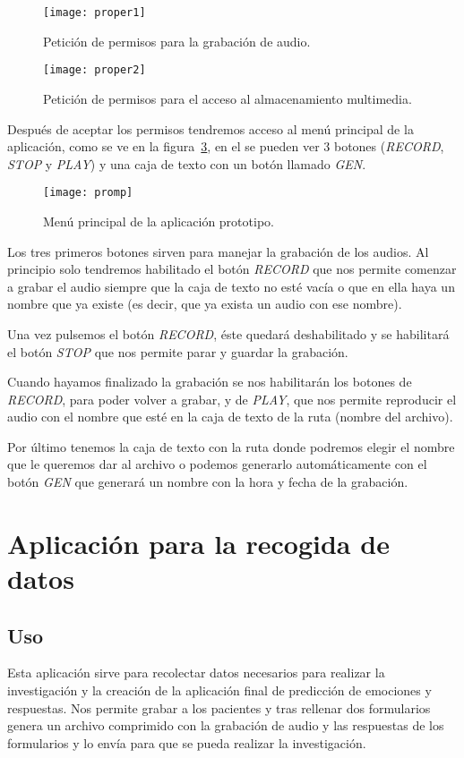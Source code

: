 \begin{figure}[htp]
	\centering
	\texttt{[image: proper1]}
	\caption{Petición de permisos para la grabación de audio.}
	\label{fig:properr1}
\end{figure}

\begin{figure}[htp]
	\centering
	\texttt{[image: proper2]}
	\caption{Petición de permisos para el acceso al almacenamiento multimedia.}
	\label{fig:proper2}
\end{figure}

Después de aceptar los permisos tendremos acceso al menú principal de la aplicación, como se ve en la figura~\ref{fig:promp}, en el se pueden ver 3 botones (\textit{RECORD}, \textit{STOP} y \textit{PLAY}) y una caja de texto con un botón llamado \textit{GEN}.

\begin{figure}[htp]
	\centering
	\texttt{[image: promp]}
	\caption{Menú principal de la aplicación prototipo.}
	\label{fig:promp}
\end{figure}

Los tres primeros botones sirven para manejar la grabación de los audios. Al principio solo tendremos habilitado el botón \textit{RECORD} que nos permite comenzar a grabar el audio siempre que la caja de texto no esté vacía o que en ella haya un nombre que ya existe (es decir, que ya exista un audio con ese nombre).

Una vez pulsemos el botón \textit{RECORD}, éste quedará deshabilitado y se habilitará el botón \textit{STOP} que nos permite parar y guardar la grabación.

Cuando hayamos finalizado la grabación se nos habilitarán los botones de \textit{RECORD}, para poder volver a grabar, y de \textit{PLAY}, que nos permite reproducir el audio con el nombre que esté en la caja de texto de la ruta (nombre del archivo).

Por último tenemos la caja de texto con la ruta donde podremos elegir el nombre que le queremos dar al archivo o podemos generarlo automáticamente con el botón \textit{GEN} que generará un nombre con la hora y fecha de la grabación.
\section{Aplicación para la recogida de datos}
\subsection{Uso}
Esta aplicación sirve para recolectar datos necesarios para realizar la investigación y la creación de la aplicación final de predicción de emociones y respuestas. Nos permite grabar a los pacientes y tras rellenar dos formularios genera un archivo comprimido con la grabación de audio y las respuestas de los formularios y lo envía para que se pueda realizar la investigación.
